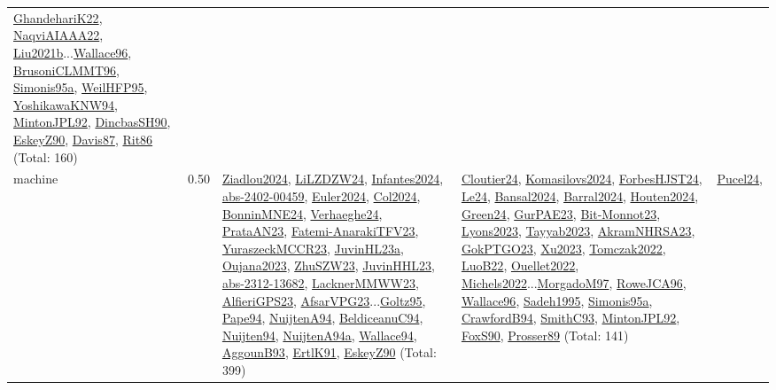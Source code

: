 {\begin{longtable}{p{3cm}r>{\raggedright\arraybackslash}p{6cm}>{\raggedright\arraybackslash}p{6cm}>{\raggedright\arraybackslash}p{8cm}}
\hyperref[detail:GhandehariK22]{GhandehariK22}, \hyperref[detail:NaqviAIAAA22]{NaqviAIAAA22}, \hyperref[detail:Liu2021b]{Liu2021b}...\hyperref[detail:Wallace96]{Wallace96}, \hyperref[detail:BrusoniCLMMT96]{BrusoniCLMMT96}, \hyperref[detail:Simonis95a]{Simonis95a}, \hyperref[detail:WeilHFP95]{WeilHFP95}, \hyperref[detail:YoshikawaKNW94]{YoshikawaKNW94}, \hyperref[detail:MintonJPL92]{MintonJPL92}, \hyperref[detail:DincbasSH90]{DincbasSH90}, \hyperref[detail:EskeyZ90]{EskeyZ90}, \hyperref[detail:Davis87]{Davis87}, \hyperref[detail:Rit86]{Rit86} (Total: 160)\\
\index{machine}\index{Scheduling!machine}machine &  0.50 & \hyperref[detail:Ziadlou2024]{Ziadlou2024}, \hyperref[detail:LiLZDZW24]{LiLZDZW24}, \hyperref[detail:Infantes2024]{Infantes2024}, \hyperref[detail:abs-2402-00459]{abs-2402-00459}, \hyperref[detail:Euler2024]{Euler2024}, \hyperref[detail:Col2024]{Col2024}, \hyperref[detail:BonninMNE24]{BonninMNE24}, \hyperref[detail:Verhaeghe24]{Verhaeghe24}, \hyperref[detail:PrataAN23]{PrataAN23}, \hyperref[detail:Fatemi-AnarakiTFV23]{Fatemi-AnarakiTFV23}, \hyperref[detail:YuraszeckMCCR23]{YuraszeckMCCR23}, \hyperref[detail:JuvinHL23a]{JuvinHL23a}, \hyperref[detail:Oujana2023]{Oujana2023}, \hyperref[detail:ZhuSZW23]{ZhuSZW23}, \hyperref[detail:JuvinHHL23]{JuvinHHL23}, \hyperref[detail:abs-2312-13682]{abs-2312-13682}, \hyperref[detail:LacknerMMWW23]{LacknerMMWW23}, \hyperref[detail:AlfieriGPS23]{AlfieriGPS23}, \hyperref[detail:AfsarVPG23]{AfsarVPG23}...\hyperref[detail:Goltz95]{Goltz95}, \hyperref[detail:Pape94]{Pape94}, \hyperref[detail:NuijtenA94]{NuijtenA94}, \hyperref[detail:BeldiceanuC94]{BeldiceanuC94}, \hyperref[detail:Nuijten94]{Nuijten94}, \hyperref[detail:NuijtenA94a]{NuijtenA94a}, \hyperref[detail:Wallace94]{Wallace94}, \hyperref[detail:AggounB93]{AggounB93}, \hyperref[detail:ErtlK91]{ErtlK91}, \hyperref[detail:EskeyZ90]{EskeyZ90} (Total: 399) & \hyperref[detail:Cloutier24]{Cloutier24}, \hyperref[detail:Komasilovs2024]{Komasilovs2024}, \hyperref[detail:ForbesHJST24]{ForbesHJST24}, \hyperref[detail:Le24]{Le24}, \hyperref[detail:Bansal2024]{Bansal2024}, \hyperref[detail:Barral2024]{Barral2024}, \hyperref[detail:Houten2024]{Houten2024}, \hyperref[detail:Green24]{Green24}, \hyperref[detail:GurPAE23]{GurPAE23}, \hyperref[detail:Bit-Monnot23]{Bit-Monnot23}, \hyperref[detail:Lyons2023]{Lyons2023}, \hyperref[detail:Tayyab2023]{Tayyab2023}, \hyperref[detail:AkramNHRSA23]{AkramNHRSA23}, \hyperref[detail:GokPTGO23]{GokPTGO23}, \hyperref[detail:Xu2023]{Xu2023}, \hyperref[detail:Tomczak2022]{Tomczak2022}, \hyperref[detail:LuoB22]{LuoB22}, \hyperref[detail:Ouellet2022]{Ouellet2022}, \hyperref[detail:Michels2022]{Michels2022}...\hyperref[detail:MorgadoM97]{MorgadoM97}, \hyperref[detail:RoweJCA96]{RoweJCA96}, \hyperref[detail:Wallace96]{Wallace96}, \hyperref[detail:Sadeh1995]{Sadeh1995}, \hyperref[detail:Simonis95a]{Simonis95a}, \hyperref[detail:CrawfordB94]{CrawfordB94}, \hyperref[detail:SmithC93]{SmithC93}, \hyperref[detail:MintonJPL92]{MintonJPL92}, \hyperref[detail:FoxS90]{FoxS90}, \hyperref[detail:Prosser89]{Prosser89} (Total: 141) & \hyperref[detail:Pucel24]{Pucel24}, 
\end{longtable}}
